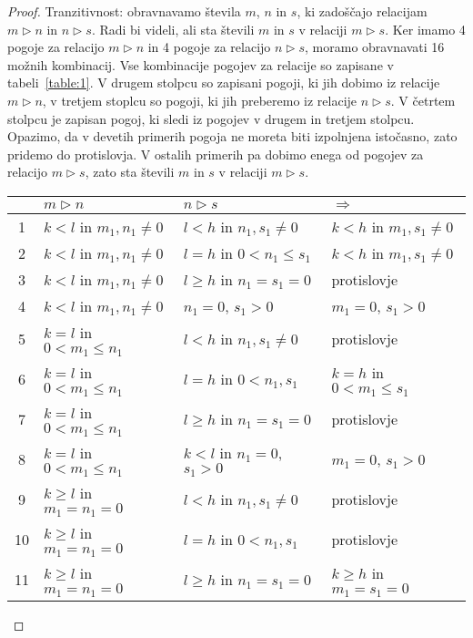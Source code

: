 \documentclass[../TG_magistrsko_delo_sections.tex]{subfiles}
\begin{document}
\begin{proof}
Tranzitivnost: obravnavamo števila $m$,  $n$ in $s$, ki zadoščajo relacijam $m \triangleright n$ in $n \triangleright s$. Radi bi videli, ali sta števili $m$ in $s$ v relaciji $m \triangleright s$. Ker imamo 4 pogoje za relacijo $m \triangleright n$ in 4 pogoje za relacijo $n \triangleright s$, moramo obravnavati 16 možnih kombinacij. Vse kombinacije pogojev za relacije so zapisane v tabeli~\ref{table:1}. V drugem stolpcu so zapisani pogoji, ki jih dobimo iz relacije $m \triangleright n$, v tretjem stoplcu so pogoji, ki jih preberemo iz relacije $n \triangleright s$. V četrtem stolpcu je zapisan pogoj, ki sledi iz pogojev v drugem in tretjem stolpcu. Opazimo, da v devetih primerih pogoja ne moreta biti izpolnjena istočasno, zato pridemo do protislovja. V ostalih primerih pa dobimo enega od pogojev za relacijo $m \triangleright s$, zato sta števili $m$ in $s$ v relaciji $m \triangleright s$.
\renewcommand{\arraystretch}{1.2}
\begin{table}[h!]
\centering
\begin{tabular}{||c | l | l | l||} 
 \hline
  & $m \triangleright n$ & $n \triangleright s$ & $\Rightarrow$ \\ [0.5ex] 
 \hline\hline
 1 & $k<l$ in $m_1, n_1 \neq 0$ & $l<h$ in $n_1, s_1 \neq 0$ & $k<h$ in $m_1, s_1 \neq 0$ \\ 
 2 & $k<l$ in $m_1, n_1 \neq 0$ & $l=h$ in $0<n_1 \leq s_1$ & $k<h$ in $m_1, s_1 \neq 0$ \\
 3 & $k<l$ in $m_1, n_1 \neq 0$ & $l \geq h$ in $n_1 = s_1 = 0$ & protislovje \\
 4 & $k<l$ in $m_1, n_1 \neq 0$ & $n_1 = 0$, $s_1 > 0$ & $m_1 = 0$, $s_1 > 0$ \\
 5 & $k=l$ in $0<m_1 \leq n_1$ & $l<h$ in $n_1, s_1 \neq 0$ & protislovje \\ 
 6 & $k=l$ in $0<m_1 \leq n_1$ & $l=h$ in $0<n_1, s_1$ & $k=h$ in $0<m_1 \leq s_1$ \\
 7 & $k=l$ in $0<m_1 \leq n_1$ & $l \geq h$ in $n_1 = s_1 = 0$ & protislovje \\
 8 & $k=l$ in $0<m_1 \leq n_1$ & $k<l$ in $n_1 = 0$, $s_1 > 0$ & $m_1 = 0$, $s_1 > 0$ \\
 9 & $k \geq l$ in $m_1 = n_1 = 0$ & $l<h$ in $n_1, s_1 \neq 0$ & protislovje \\ 
 10 & $k \geq l$ in $m_1 = n_1 = 0$ & $l=h$ in $0<n_1, s_1$ & protislovje \\
 11 & $k \geq l$ in $m_1 = n_1 = 0$ & $l \geq h$ in $n_1 = s_1 = 0$ & $k \geq h$ in $m_1 = s_1 = 0$ \\

\end{tabular}
\end{table}
\end{proof}
\end{document}
